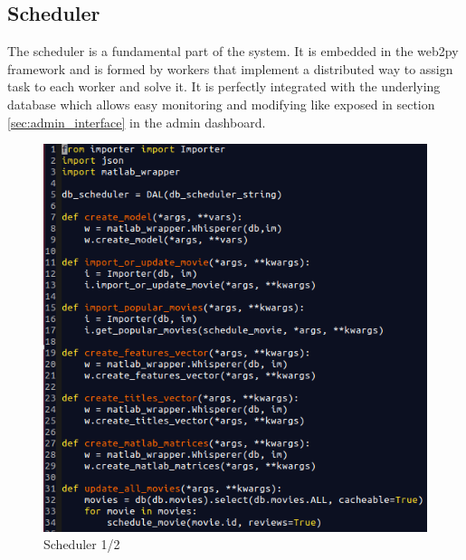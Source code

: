 \subsection{Scheduler}
\label{sec:scheduler}

The scheduler is a fundamental part of the system. It is embedded in the web2py \cite{web2py} framework and is formed by workers that implement a distributed way to assign task to each worker and solve it. It is perfectly integrated with the underlying database which allows easy monitoring and modifying like exposed in section \ref{sec:admin_interface} in the admin dashboard.

\begin{figure}
  \centering
  \includegraphics[width=\textwidth]{figures/scheduler1.png}
  \caption{Scheduler 1/2}
  \label{fig:scheduler1}
\end{figure}

